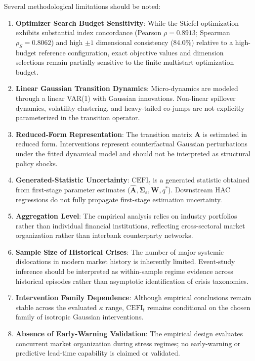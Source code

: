 \documentclass[review,12pt,authoryear]{elsarticle}
\begin{document}
Several methodological limitations should be noted:
\begin{enumerate}
    \item \textbf{Optimizer Search Budget Sensitivity}: While the Stiefel optimization exhibits substantial index concordance (Pearson $\rho = 0.8913$; Spearman $\rho_S = 0.8062$) and high $\pm 1$ dimensional consistency (84.0\%) relative to a high-budget reference configuration, exact objective values and dimension selections remain partially sensitive to the finite multistart optimization budget.
    \item \textbf{Linear Gaussian Transition Dynamics}: Micro-dynamics are modeled through a linear VAR(1) with Gaussian innovations. Non-linear spillover dynamics, volatility clustering, and heavy-tailed co-jumps are not explicitly parameterized in the transition operator.
    \item \textbf{Reduced-Form Representation}: The transition matrix $\mathbf{A}$ is estimated in reduced form. Interventions represent counterfactual Gaussian perturbations under the fitted dynamical model and should not be interpreted as structural policy shocks.
    \item \textbf{Generated-Statistic Uncertainty}: $\mathrm{CEFI}_t$ is a generated statistic obtained from first-stage parameter estimates ($\hat{\mathbf{A}}, \boldsymbol{\Sigma}_\varepsilon, \mathbf{W}, q^*$). Downstream HAC regressions do not fully propagate first-stage estimation uncertainty.
    \item \textbf{Aggregation Level}: The empirical analysis relies on industry portfolios rather than individual financial institutions, reflecting cross-sectoral market organization rather than interbank counterparty networks.
    \item \textbf{Sample Size of Historical Crises}: The number of major systemic dislocations in modern market history is inherently limited. Event-study inference should be interpreted as within-sample regime evidence across historical episodes rather than asymptotic identification of crisis taxonomies.
    \item \textbf{Intervention Family Dependence}: Although empirical conclusions remain stable across the evaluated $\kappa$ range, $\mathrm{CEFI}_t$ remains conditional on the chosen family of isotropic Gaussian interventions.
    \item \textbf{Absence of Early-Warning Validation}: The empirical design evaluates concurrent market organization during stress regimes; no early-warning or predictive lead-time capability is claimed or validated.
\end{enumerate}
\end{document}
